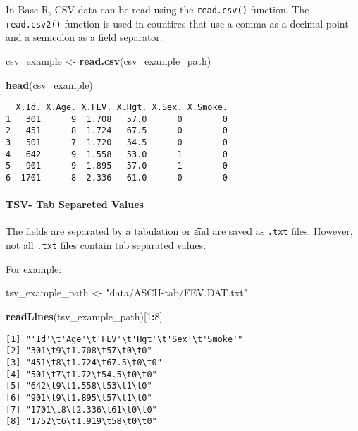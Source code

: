 \documentclass[]{book}
\newenvironment{Shaded}{\begin{snugshade}}{\end{snugshade}}
\newcommand{\KeywordTok}[1]{\textcolor[rgb]{0.13,0.29,0.53}{\textbf{#1}}}
\newcommand{\DecValTok}[1]{\textcolor[rgb]{0.00,0.00,0.81}{#1}}
\newcommand{\StringTok}[1]{\textcolor[rgb]{0.31,0.60,0.02}{#1}}
\newcommand{\OperatorTok}[1]{\textcolor[rgb]{0.81,0.36,0.00}{\textbf{#1}}}
\newcommand{\NormalTok}[1]{#1}
\let\oldparagraph\paragraph
\renewcommand{\paragraph}[1]{\oldparagraph{#1}\mbox{}}
\theoremstyle{definition}
\theoremstyle{definition}
\theoremstyle{definition}
\theoremstyle{remark}
\begin{document}
In Base-R, CSV data can be read using the \texttt{read.csv()} function.
The \texttt{read.csv2()} function is used in countires that use a comma
as a decimal point and a semicolon as a field separator.

\begin{Shaded}
\begin{Highlighting}[]
\NormalTok{csv_example <-}\StringTok{ }\KeywordTok{read.csv}\NormalTok{(csv_example_path)}

\KeywordTok{head}\NormalTok{(csv_example)}
\end{Highlighting}
\end{Shaded}

\begin{verbatim}
  X.Id. X.Age. X.FEV. X.Hgt. X.Sex. X.Smoke.
1   301      9  1.708   57.0      0        0
2   451      8  1.724   67.5      0        0
3   501      7  1.720   54.5      0        0
4   642      9  1.558   53.0      1        0
5   901      9  1.895   57.0      1        0
6  1701      8  2.336   61.0      0        0
\end{verbatim}

\paragraph{TSV- Tab Separeted Values}\label{tsv--tab-separeted-values}

The fields are separated by a tabulation or \t and are saved as
\texttt{.txt} files. However, not all \texttt{.txt} files contain tab
separated values.

For example:

\begin{Shaded}
\begin{Highlighting}[]
\NormalTok{tsv_example_path <-}\StringTok{ "data/ASCII-tab/FEV.DAT.txt"}

\KeywordTok{readLines}\NormalTok{(tsv_example_path)[}\DecValTok{1}\OperatorTok{:}\DecValTok{8}\NormalTok{]}
\end{Highlighting}
\end{Shaded}

\begin{verbatim}
[1] "'Id'\t'Age'\t'FEV'\t'Hgt'\t'Sex'\t'Smoke'"
[2] "301\t9\t1.708\t57\t0\t0"                  
[3] "451\t8\t1.724\t67.5\t0\t0"                
[4] "501\t7\t1.72\t54.5\t0\t0"                 
[5] "642\t9\t1.558\t53\t1\t0"                  
[6] "901\t9\t1.895\t57\t1\t0"                  
[7] "1701\t8\t2.336\t61\t0\t0"                 
[8] "1752\t6\t1.919\t58\t0\t0"                 
\end{verbatim}
\end{document}

